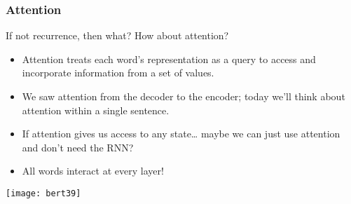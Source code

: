 \begin{frame}[fragile]\frametitle{Attention}

If not recurrence, then what? How about attention?

\begin{itemize}
\item Attention treats each word’s representation as a query to access and  incorporate information from a set of values.
\item We saw attention from the decoder to the encoder; today we’ll think about
attention within a single sentence.
\item If attention gives us access to any state… maybe we can just use attention and don’t need the RNN?
\item All words interact at every layer!

\end{itemize}	 

\begin{center}
\texttt{[image: bert39]}
\end{center}	

 
\end{frame}

